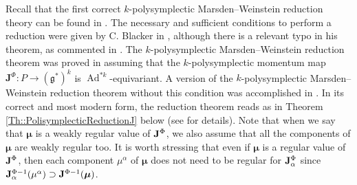 \documentclass[11pt]{article}
\theoremstyle{plain}
\theoremstyle{definition}
\DeclareMathOperator{\Ad}{Ad}
\numberwithin{equation}{section}
\begin{document}
Recall that the first correct $k$-polysymplectic Marsden--Weinstein reduction theory can be found in \cite{MRSV_15}. The necessary and sufficient conditions to perform a reduction were given by C. Blacker in \cite{Bla_19}, although there is a relevant typo in his theorem, as commented in \cite{GM_23}. The $k$-polysymplectic Marsden--Weinstein reduction theorem was proved in \cite{MRSV_15} assuming that the $k$-polysymplectic momentum map $\mathbf{J}^\Phi:P\rightarrow (\mathfrak{g}^*)^k$ is $\Ad^{*k}$-equivariant. A version of the $k$-polysymplectic Marsden--Weinstein reduction theorem without this condition was accomplished in \cite{LRVZ_23}. In its correct and most modern form, the reduction theorem reads as in Theorem \ref{Th::PolisymplecticReductionJ} below (see \cite[Theorem 5.10]{LRVZ_23} for details). Note that when we say that $\bm \mu$ is a weakly regular value of ${\bf J}^\Phi$, we also assume that all the components of $\bm\mu$ are weakly regular too. It is worth stressing that even if $\bm \mu$ is a  regular value of ${\bf J}^\Phi$, then each component $\mu^
\alpha$ of $\bm\mu$ does not need to be regular for ${\bf J}^\Phi_\alpha$ since ${\bf J}_\alpha^{\Phi-1}(\mu^\alpha)\supset {\bf J}^{\Phi-1}(\bm\mu)$.  
\end{document}
